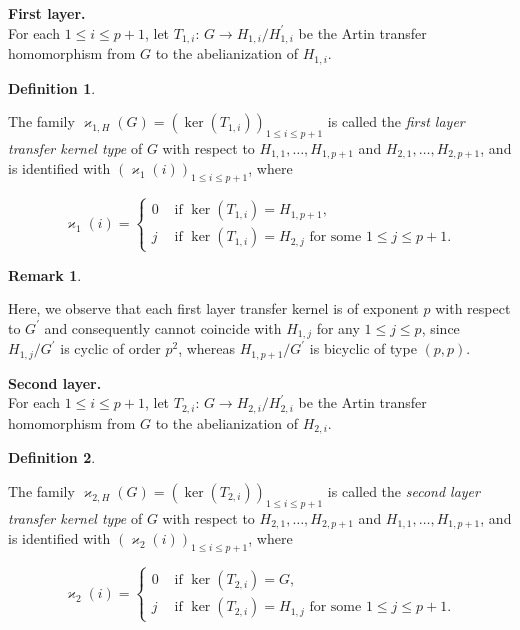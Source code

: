 \documentclass{amsart}
\theoremstyle{definition}
\newtheorem{definition}{Definition}[section]
\newtheorem{remark}{Remark}[section]
\numberwithin{equation}{section}
\begin{document}
\noindent
\textbf{First layer.}\\
For each \(1\le i\le p+1\),
let \(T_{1,i}:\,G\to H_{1,i}/H_{1,i}^\prime\) be the Artin transfer homomorphism
from \(G\) to the abelianization of \(H_{1,i}\).

\begin{definition}
\label{dfn:DrvQtnTypePe2PeLyr1}

The family \(\varkappa_{1,H}(G)=(\ker(T_{1,i}))_{1\le i\le p+1}\) is called
the \textit{first layer transfer kernel type} of \(G\)
with respect to \(H_{1,1},\ldots,H_{1,p+1}\) and \(H_{2,1},\ldots,H_{2,p+1}\),
and is identified with \((\varkappa_1(i))_{1\le i\le p+1}\), where

\begin{equation}
\label{eqn:TKTP2xPLyr1}
\varkappa_1(i)=
\begin{cases}
0 & \text{ if } \ker(T_{1,i})=H_{1,p+1},\\
j & \text{ if } \ker(T_{1,i})=H_{2,j} \text{ for some } 1\le j\le p+1.
\end{cases}
\end{equation}

\end{definition}

\begin{remark}
\label{rmk:DrvQtnTypePe2Pe}

Here, we observe that each first layer transfer kernel
is of exponent \(p\) with respect to \(G^\prime\)
and consequently cannot coincide with \(H_{1,j}\) for any \(1\le j\le p\),
since \(H_{1,j}/G^\prime\) is cyclic of order \(p^2\),
whereas \(H_{1,p+1}/G^\prime\) is bicyclic of type \((p,p)\).

\end{remark}


\noindent
\textbf{Second layer.}\\
For each \(1\le i\le p+1\),
let \(T_{2,i}:\,G\to H_{2,i}/H_{2,i}^\prime\) be the Artin transfer homomorphism
from \(G\) to the abelianization of \(H_{2,i}\).

\begin{definition}
\label{dfn:DrvQtnTypePe2PeLyr2}

The family \(\varkappa_{2,H}(G)=(\ker(T_{2,i}))_{1\le i\le p+1}\) is called
the \textit{second layer transfer kernel type} of \(G\)
with respect to \(H_{2,1},\ldots,H_{2,p+1}\) and \(H_{1,1},\ldots,H_{1,p+1}\),
and is identified with \((\varkappa_2(i))_{1\le i\le p+1}\), where

\begin{equation}
\label{eqn:TKTP2xPLyr2}
\varkappa_2(i)=
\begin{cases}
0 & \text{ if } \ker(T_{2,i})=G,\\
j & \text{ if } \ker(T_{2,i})=H_{1,j} \text{ for some } 1\le j\le p+1.
\end{cases}
\end{equation}

\end{definition}
\end{document}
